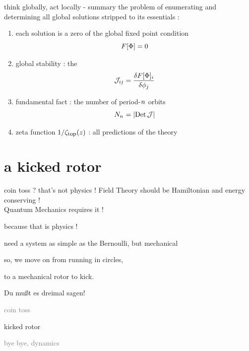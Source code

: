 \begin{frame}{think globally, act locally - summary}
\bigskip
the problem of enumerating and determining all global solutions stripped
to its essentials :
\bigskip
\begin{enumerate}
              \item
each solution is a zero of the global {\color{blue}fixed point} condition
\[
F[\Phi] = 0
\]
              \item
{\color{blue}global stability} :  the {\jacobianOrb}
\[
{\cal J}_{ij} =\frac{\delta F[\Phi]_i}{\delta \phi_j}
\]
              \item
{\color{blue}fundamental fact} : the number of period-${n_{}}$ orbits
\[
N_{n_{}} = |\mbox{\rm Det}\,{\cal J}|
\]

              \item
{\color{blue}zeta function} $1/\zeta_{\mbox{\footnotesize top}} (z)$ : all predictions of the theory
            \end{enumerate}
\end{frame} %


\section[a kicked rotor]
 {a kicked rotor}

\begin{frame}{coin toss ? that's not physics !}
Field Theory should be
Hamiltonian and energy conserving ! \\
Quantum Mechanics requires it !

\hfill
because {\color{blue}that is physics} {\color{red}!}
\bigskip

need a system as simple
as the Bernoulli, but {\color{blue}mechanical}
\bigskip

so, we move on from running in circles,

\hfill
to a mechanical {\color{blue}rotor} to kick.
\end{frame} %

\begin{frame}{}
\begin{bartlett}{
Du mu{\ss}t es dreimal sagen!
        }
\end{bartlett}
\vfill
\begin{enumerate}
              \item \textcolor{gray}{\small
coin toss
                  }
              \item {\Large
kicked rotor
                  }\textcolor{gray}{\small
              \item
\catlatt
              \item
bye bye, dynamics
                    }
            \end{enumerate}
\end{frame} %


